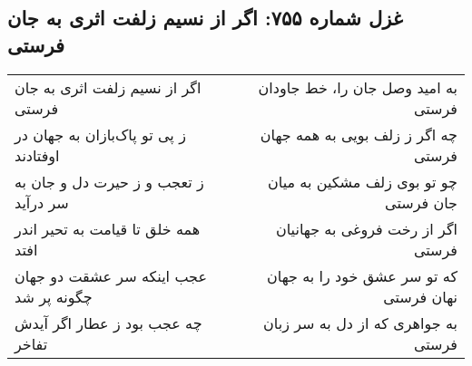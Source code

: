 \begin{center}
\section*{غزل شماره ۷۵۵: اگر از نسیم زلفت اثری به جان فرستی}
\label{sec:755}
\begin{longtable}{l p{0.5cm} r}
اگر از نسیم زلفت اثری به جان فرستی
&&
به امید وصل جان را، خط جاودان فرستی
\\
ز پی تو پاک‌بازان به جهان در اوفتادند
&&
چه اگر ز زلف بویی به همه جهان فرستی
\\
ز تعجب و ز حیرت دل و جان به سر درآید
&&
چو تو بوی زلف مشکین به میان جان فرستی
\\
همه خلق تا قیامت به تحیر اندر افتد
&&
اگر از رخت فروغی به جهانیان فرستی
\\
عجب اینکه سر عشقت دو جهان چگونه پر شد
&&
که تو سر عشق خود را به جهان نهان فرستی
\\
چه عجب بود ز عطار اگر آیدش تفاخر
&&
به جواهری که از دل به سر زبان فرستی
\\
\end{longtable}
\end{center}
